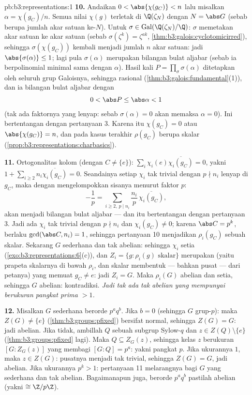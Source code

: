 \begin{solution}{pb:b3:representations:1}
\textbf{10.} Andaikan $0 < \abs{\chi(g_C)} < n$ lalu misalkan $\alpha
= \chi(g_C)/n$. Semua nilai $\chi(g)$ terletak di $\Q(\zeta_N)$ dengan $N =
\abs G$ (sebab berupa jumlah akar satuan ke-$N$). Untuk $\sigma \in
\operatorname{Gal}(\Q(\zeta_N)/\Q)$: $\sigma$ memetakan akar satuan
ke akar satuan (sebab $\sigma(\zeta^k) = \zeta^{ak}$,
\cref{thm:b3:galois:cyclotomicirred}), sehingga $\sigma(\chi(g_C))$
kembali menjadi jumlah $n$ akar satuan: jadi $\abs{\sigma(\alpha)}
\leq 1$; lagi pula $\sigma(\alpha)$ merupakan bilangan bulat aljabar (sebab ia
berpolinomial minimal sama dengan $\alpha$). Hasil kali $P =
\prod_\sigma \sigma(\alpha)$ ditetapkan oleh seluruh grup
Galoisnya, sehingga rasional (\cref{thm:b3:galois:fundamental}(1)),
dan ia bilangan bulat aljabar dengan
\[
0 < \abs P \leq \abs\alpha < 1
\]
(tak ada faktornya yang lenyap: sebab $\sigma(\alpha) = 0$ akan memaksa $\alpha =
0$). Ini bertentangan dengan pertanyaan 3. Karena itu $\chi(g_C) = 0$ atau
$\abs{\chi(g_C)} = n$, dan pada kasus terakhir $\rho(g_C)$ berupa
skalar (\cref{prop:b3:representations:charbasics}).

\textbf{11.} Ortogonalitas kolom (dengan $C \neq \{e\}$):
$\sum_i \chi_i(e)\overline{\chi_i(g_C)} = 0$, yakni $1 +
\sum_{i \geq 2} n_i\overline{\chi_i(g_C)} = 0$. Seandainya setiap
$\chi_i$ tak trivial dengan $p \nmid n_i$ lenyap di $g_C$, maka
dengan mengelompokkan sisanya menurut faktor $p$:
\[
-\frac1p = \sum_{i \geq 2,\ p \mid n_i}
\frac{n_i}{p}\,\overline{\chi_i(g_C)},
\]
akan menjadi bilangan bulat aljabar --- dan itu bertentangan dengan pertanyaan 3. Jadi ada
$\chi_i$ tak trivial dengan $p \nmid n_i$ dan $\chi_i(g_C) \neq 0$;
karena $\abs C = p^k$, berlaku $\gcd(\abs C, n_i) = 1$, sehingga pertanyaan 10
menjadikan $\rho_i(g_C)$ sebuah skalar. Sekarang $G$ sederhana dan tak abelian:
sehingga $\chi_i$ setia (\cref{exo:b3:representations:6}(c)), dan
$Z_i = \{g : \rho_i(g) \text{ skalar}\}$ merupakan 
(yaitu prapeta skalarnya di bawah $\rho_i$, dan skalar membentuk
 --- bahkan pusat --- dari petanya) yang memuat
$g_C \neq e$: jadi $Z_i = G$. Maka $\rho_i(G)$ abelian dan
setia, sehingga $G$ abelian: kontradiksi. \emph{Jadi tak ada  tak abelian yang mempunyai  berukuran pangkat prima
$> 1$.}

\textbf{12.} Misalkan $G$ sederhana berorde $p^aq^b$. Jika $b = 0$
(sehingga $G$ grup-$p$): maka $Z(G) \neq \{e\}$
(\cref{thm:b3:groups:pfixed}) bersifat normal, sehingga $Z(G) = G$: jadi abelian.
Jika tidak, ambillah $Q$ sebuah subgrup Sylow-$q$ dan $z \in Z(Q)
\setminus\{e\}$ (\cref{thm:b3:groups:pfixed} lagi). Maka $Q
\subseteq Z_G(z)$, sehingga kelas $z$ berukuran $[G : Z_G(z)]$
yang membagi $[G : Q] = p^a$: yakni pangkat $p$. Jika ukurannya $1$,
maka $z \in Z(G)$: pusatnya menjadi  tak trivial, sehingga
$Z(G) = G$, jadi abelian. Jika ukurannya $p^k > 1$: pertanyaan 11
melarangnya bagi $G$ yang sederhana dan tak abelian. Bagaimanapun juga, 
berorde $p^aq^b$ pastilah abelian (yakni $\cong \Z/p\Z$).


\end{solution}
